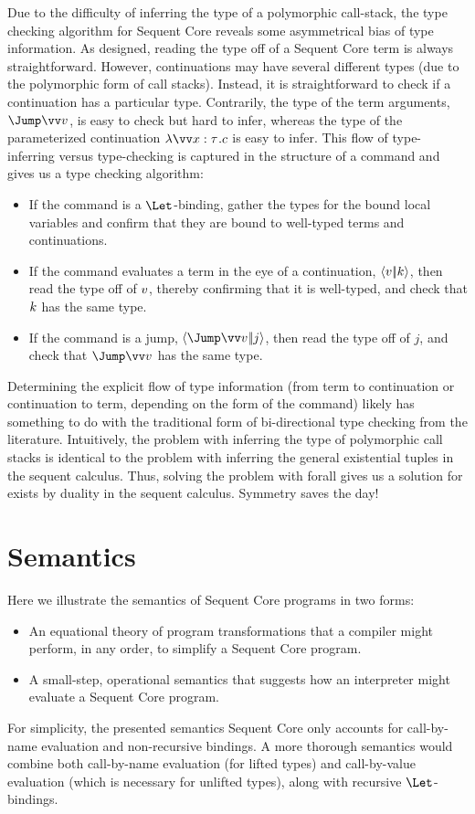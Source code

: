 \documentclass{article}
\begin{document}
Due to the difficulty of inferring the type of a polymorphic call-stack, the
type checking algorithm for Sequent Core reveals some asymmetrical bias of type
information.  As designed, reading the type off of a Sequent Core term is always
straightforward.  However, continuations may have several different types (due
to the polymorphic form of call stacks).  Instead, it is straightforward to
check if a continuation has a particular type.  Contrarily, the type of the term
arguments, $\Jump\vect{\tm}$, is easy to check but hard to infer, whereas the
type of the parameterized continuation $\fnk{\vect{x:\ty}}\cmd$ is easy to
infer.  This flow of type-inferring versus type-checking is captured in the
structure of a command and gives us a type checking algorithm:
\begin{itemize}
\item If the command is a $\Let$-binding, gather the types for the bound local
  variables and confirm that they are bound to well-typed terms and
  continuations.
\item If the command evaluates a term in the eye of a continuation,
  $\left\langle{v}\middle|\!\middle|{k}\right\rangle$, then read the type off of $v$, thereby confirming that it
  is well-typed, and check that $k$ has the same type.
\item If the command is a jump, $\jump{\vect{\tm}}{j}$, then read the type off
  of $j$, and check that $\Jump\vect{\tm}$ has the same type.
\end{itemize}
Determining the explicit flow of type information (from term to continuation or
continuation to term, depending on the form of the command) likely has something
to do with the traditional form of bi-directional type checking from the
literature.  Intuitively, the problem with inferring the type of polymorphic
call stacks is identical to the problem with inferring the general existential
tuples in the sequent calculus.  Thus, solving the problem with forall gives us
a solution for exists by duality in the sequent calculus.  Symmetry saves the
day!

\section{Semantics}
\label{sec:semantics}

Here we illustrate the semantics of Sequent Core programs in two forms:
\begin{itemize}
\item An equational theory of program transformations that a compiler might
  perform, in any order, to simplify a Sequent Core program.
\item A small-step, operational semantics that suggests how an interpreter might
  evaluate a Sequent Core program.
\end{itemize}
For simplicity, the presented semantics Sequent Core only accounts for
call-by-name evaluation and non-recursive bindings.  A more thorough semantics
would combine both call-by-name evaluation (for lifted types) and call-by-value
evaluation (which is necessary for unlifted types), along with recursive
$\Let$-bindings.
\end{document}
